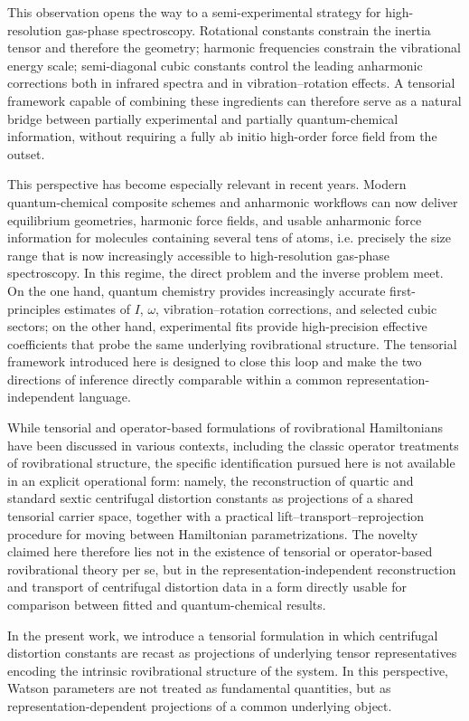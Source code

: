 \documentclass[aip,jcp,reprint,floatfix]{revtex4-2}
\begin{document}
This observation opens the way to a semi-experimental strategy for
high-resolution gas-phase spectroscopy. Rotational constants constrain
the inertia tensor and therefore the geometry; harmonic frequencies
constrain the vibrational energy scale; semi-diagonal cubic constants
control the leading anharmonic corrections both in infrared spectra
and in vibration--rotation effects. A tensorial framework capable of
combining these ingredients can therefore serve as a natural bridge
between partially experimental and partially quantum-chemical
information, without requiring a fully ab initio high-order force
field from the outset.

This perspective has become especially relevant in recent years. Modern
quantum-chemical composite schemes and anharmonic workflows can now
deliver equilibrium geometries, harmonic force fields, and usable
anharmonic force information for molecules containing several tens of
atoms, i.e. precisely the size range that is now increasingly
accessible to high-resolution gas-phase spectroscopy. In this regime,
the direct problem and the inverse problem meet. On the one hand,
quantum chemistry provides increasingly accurate first-principles
estimates of $I$, $\omega$, vibration--rotation corrections, and
selected cubic sectors; on the other hand, experimental fits provide
high-precision effective coefficients that probe the same underlying
rovibrational structure. The tensorial framework introduced here is
designed to close this loop and make the two directions of inference
directly comparable within a common representation-independent
language.

While tensorial and operator-based formulations of rovibrational
Hamiltonians have been discussed in various contexts, including the
classic operator treatments of rovibrational structure,\cite{BunkerJensen2005,JensenBunker2000}
the specific
identification pursued here is not available in an
explicit operational form: namely, the reconstruction of quartic and
standard sextic centrifugal distortion constants as projections of a
shared tensorial carrier space, together with a practical
lift--transport--reprojection procedure for moving between Hamiltonian
parametrizations. The novelty claimed here therefore lies not in the
existence of tensorial or operator-based rovibrational theory per se,
but in the representation-independent reconstruction and transport of
centrifugal distortion data in a form directly usable for comparison
between fitted and quantum-chemical results.

In the present work, we introduce a tensorial formulation in which
centrifugal distortion constants are recast as projections of
underlying tensor representatives encoding the intrinsic
rovibrational structure of the system. In this perspective, Watson
parameters are not treated as fundamental quantities, but as
representation-dependent projections of a common underlying object.
\end{document}
